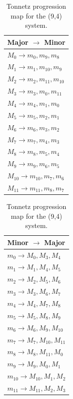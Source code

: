 \documentclass[11pt,letterpaper]{amsart}
\begin{document}
{\tiny \begin{table}[H]
    \centering
    \begin{minipage}{0.48\textwidth}
        \centering
        \begin{tabular}{l}
        \toprule
        \textbf{Major $\to$ Minor} \\
        \midrule
        $M_0 \to m_0, m_9, m_8$ \\
        $M_1 \to m_1, m_{10}, m_9$ \\
        $M_2 \to m_2, m_{11}, m_{10}$ \\
        $M_3 \to m_3, m_0, m_{11}$ \\
        $M_4 \to m_4, m_1, m_0$ \\
        $M_5 \to m_5, m_2, m_1$ \\
        $M_6 \to m_6, m_3, m_2$ \\
        $M_7 \to m_7, m_4, m_3$ \\
        $M_8 \to m_8, m_5, m_4$ \\
        $M_9 \to m_9, m_6, m_5$ \\
        $M_{10} \to m_{10}, m_7, m_6$ \\
        $M_{11} \to m_{11}, m_8, m_7$ \\
        \bottomrule
        \end{tabular}
    \end{minipage}\hfill
    \begin{minipage}{0.48\textwidth}
        \centering
        \begin{tabular}{l}
        \toprule
        \textbf{Minor $\to$ Major} \\
        \midrule
        $m_0 \to M_0, M_3, M_4$ \\
        $m_1 \to M_1, M_4, M_5$ \\
        $m_2 \to M_2, M_5, M_6$ \\
        $m_3 \to M_3, M_6, M_7$ \\
        $m_4 \to M_4, M_7, M_8$ \\
        $m_5 \to M_5, M_8, M_9$ \\
        $m_6 \to M_6, M_9, M_{10}$ \\
        $m_7 \to M_7, M_{10}, M_{11}$ \\
        $m_8 \to M_8, M_{11}, M_0$ \\
        $m_9 \to M_9, M_0, M_1$ \\
        $m_{10} \to M_{10}, M_1, M_2$ \\
        $m_{11} \to M_{11}, M_2, M_3$ \\
        \bottomrule
        \end{tabular}
    \end{minipage}
    \caption{Tonnetz progression map for the (9,4) system.}
\end{table}}
\end{document}
